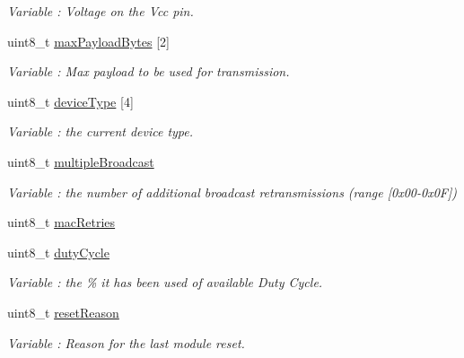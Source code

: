 \begin{DoxyCompactItemize}
\begin{DoxyCompactList}\small\item\em Variable \+: Voltage on the Vcc pin. \end{DoxyCompactList}\item 
uint8\+\_\+t \hyperlink{class_wasp_x_bee868_a78a69ab814d8b3f981504c4b3a3b0e4e}{max\+Payload\+Bytes} \mbox{[}2\mbox{]}\hypertarget{class_wasp_x_bee868_a78a69ab814d8b3f981504c4b3a3b0e4e}{}\label{class_wasp_x_bee868_a78a69ab814d8b3f981504c4b3a3b0e4e}

\begin{DoxyCompactList}\small\item\em Variable \+: Max payload to be used for transmission. \end{DoxyCompactList}\item 
uint8\+\_\+t \hyperlink{class_wasp_x_bee868_a7d5633f0f081d42a13a4fa6062c832ca}{device\+Type} \mbox{[}4\mbox{]}\hypertarget{class_wasp_x_bee868_a7d5633f0f081d42a13a4fa6062c832ca}{}\label{class_wasp_x_bee868_a7d5633f0f081d42a13a4fa6062c832ca}

\begin{DoxyCompactList}\small\item\em Variable \+: the current device type. \end{DoxyCompactList}\item 
uint8\+\_\+t \hyperlink{class_wasp_x_bee868_a4eca958691ed5751b30986fa64a740c7}{multiple\+Broadcast}\hypertarget{class_wasp_x_bee868_a4eca958691ed5751b30986fa64a740c7}{}\label{class_wasp_x_bee868_a4eca958691ed5751b30986fa64a740c7}

\begin{DoxyCompactList}\small\item\em Variable \+: the number of additional broadcast retransmissions (range \mbox{[}0x00-\/0x0F\mbox{]}) \end{DoxyCompactList}\item 
uint8\+\_\+t \hyperlink{class_wasp_x_bee868_a90eb13a216470e49f72cc88c24186769}{mac\+Retries}
\item 
uint8\+\_\+t \hyperlink{class_wasp_x_bee868_ab741daa10b99f9c4eae8d929a0f5090f}{duty\+Cycle}\hypertarget{class_wasp_x_bee868_ab741daa10b99f9c4eae8d929a0f5090f}{}\label{class_wasp_x_bee868_ab741daa10b99f9c4eae8d929a0f5090f}

\begin{DoxyCompactList}\small\item\em Variable \+: the \% it has been used of available Duty Cycle. \end{DoxyCompactList}\item 
uint8\+\_\+t \hyperlink{class_wasp_x_bee868_a6d560c124640955d60399b2662dc185b}{reset\+Reason}\hypertarget{class_wasp_x_bee868_a6d560c124640955d60399b2662dc185b}{}\label{class_wasp_x_bee868_a6d560c124640955d60399b2662dc185b}

\begin{DoxyCompactList}\small\item\em Variable \+: Reason for the last module reset. \end{DoxyCompactList}\end{DoxyCompactItemize}

